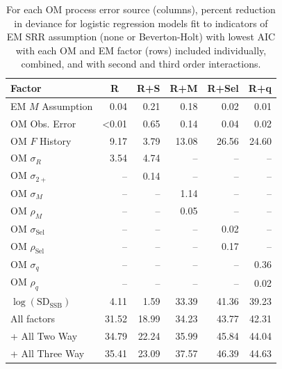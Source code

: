 \documentclass[
  12pt,
]{article}
\begin{document}
\begin{table}
\caption{For each OM process error source (columns), percent reduction in deviance for logistic regression models fit to indicators of EM SRR assumption (none or Beverton-Holt) with lowest AIC with each OM and EM factor (rows) included individually, combined, and with second and third order interactions.}\label{AIC_SRR_PRD_table}
{\begin{center}
\begin{tabular}{lrrrrr}
\hline\hline
\multicolumn{1}{l}{Factor}&\multicolumn{1}{c}{R}&\multicolumn{1}{c}{R+S}&\multicolumn{1}{c}{R+M}&\multicolumn{1}{c}{R+Sel}&\multicolumn{1}{c}{R+q}\tabularnewline
\hline
EM $M$ Assumption& 0.04& 0.21& 0.18& 0.02& 0.01\tabularnewline
OM Obs. Error&\textless  0.01& 0.65& 0.14& 0.04& 0.02\tabularnewline
OM $F$ History& 9.17& 3.79&13.08&26.56&24.60\tabularnewline
OM $\sigma_R$& 3.54& 4.74&--&--&--\tabularnewline
OM $\sigma_{2+}$ &--& 0.14&--&--&--\tabularnewline
OM $\sigma_M$&--&--& 1.14&--&--\tabularnewline
OM $\rho_M$&--&--& 0.05&--&--\tabularnewline
OM $\sigma_{\text{Sel}}$&--&--&--& 0.02&--\tabularnewline
OM $\rho_{\text{Sel}}$&--&--&--& 0.17&--\tabularnewline
OM $\sigma_q$&--&--&--&--& 0.36\tabularnewline
OM $\rho_q$&--&--&--&--& 0.02\tabularnewline
$\log\left(\text{SD}_\text{SSB}\right)$& 4.11& 1.59&33.39&41.36&39.23\tabularnewline
All factors&31.52&18.99&34.23&43.77&42.31\tabularnewline
+ All Two Way&34.79&22.24&35.99&45.84&44.04\tabularnewline
+ All Three Way&35.41&23.09&37.57&46.39&44.63\tabularnewline
\hline
\end{tabular}\end{center}
}
\end{table}
\end{document}
